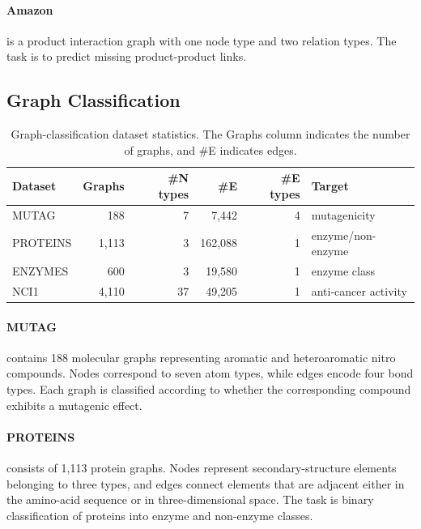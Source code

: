 \paragraph{Amazon}
is a product interaction graph with one node type and two relation types. The
task is to predict missing product-product links.

\subsection{Graph Classification}

\begin{table}[H]
  \centering
  \caption{Graph-classification dataset statistics. The Graphs column indicates the
  number of graphs, and \#E indicates edges.}
  \label{tab:graph-datasets}
  \scriptsize
  \setlength{\tabcolsep}{2.5pt}
  \resizebox{\columnwidth}{!}
  {%
  \begin{tabular}{lrrrrl}
    \toprule
    \textbf{Dataset} & \textbf{Graphs} & \textbf{\#N types} & \textbf{\#E} &
    \textbf{\#E types} & \textbf{Target} \\
    \midrule
    MUTAG & 188 & 7 & 7{,}442 & 4 & mutagenicity \\
    PROTEINS & 1{,}113 & 3 & 162{,}088 & 1 & enzyme/non-enzyme \\
    ENZYMES & 600 & 3 & 19{,}580 & 1 & enzyme class \\
    NCI1 & 4{,}110 & 37 & 49{,}205 & 1 & anti-cancer activity \\
    \bottomrule
  \end{tabular}%
  }
\end{table}

\paragraph{MUTAG}
contains 188 molecular graphs representing aromatic and heteroaromatic
nitro compounds. Nodes correspond to seven atom types, while edges encode four
bond types. Each graph is classified according to whether the corresponding
compound exhibits a mutagenic effect.
\paragraph{PROTEINS}
consists of 1,113 protein graphs. Nodes represent secondary-structure
elements belonging to three types, and edges connect elements that are
adjacent either in the amino-acid sequence or in three-dimensional space. The
task is binary classification of proteins into enzyme and non-enzyme classes.
